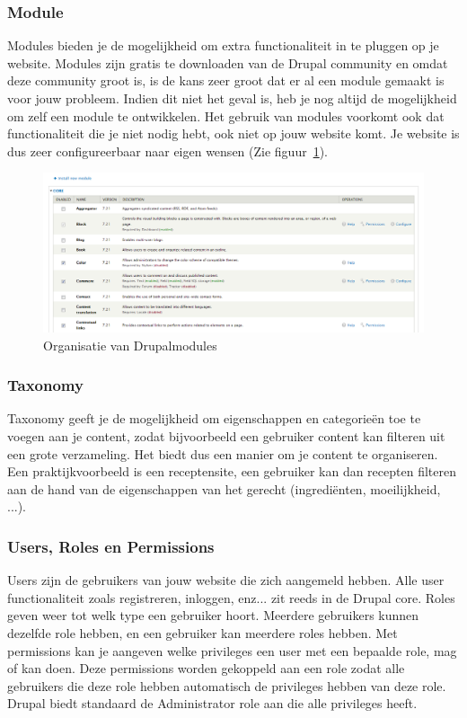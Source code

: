 \subsubsection{Module}
Modules bieden je de mogelijkheid om extra functionaliteit in te pluggen op je website. Modules zijn gratis te downloaden van de Drupal community en omdat deze community groot is, is de kans zeer groot dat er al een module gemaakt is voor jouw probleem. Indien dit niet het geval is, heb je nog altijd de mogelijkheid om zelf een module te ontwikkelen. Het gebruik van modules voorkomt ook dat functionaliteit die je niet nodig hebt, ook niet op jouw website komt. Je website is dus zeer configureerbaar naar eigen wensen (Zie figuur~\ref{fig:drupalOrganizeModules}).
\begin{figure}[h]
\includegraphics[width=1\textwidth]{fig/drupalOrganizeModules}
\caption{Organisatie van Drupalmodules}
\label{fig:drupalOrganizeModules}
\end{figure}

\subsubsection{Taxonomy}
Taxonomy geeft je de mogelijkheid om eigenschappen en categorie\"{e}n toe te voegen aan je content, zodat bijvoorbeeld een gebruiker content kan filteren uit een grote verzameling. Het biedt dus een manier om je content te organiseren. Een praktijkvoorbeeld is een receptensite, een gebruiker kan dan recepten filteren aan de hand van de eigenschappen van het gerecht (ingredi\"{e}nten, moeilijkheid, ...).

\subsubsection{Users, Roles en Permissions}
Users zijn de gebruikers van jouw website die zich aangemeld hebben. Alle user functionaliteit zoals registreren, inloggen, enz... zit reeds in de Drupal core. Roles geven weer tot welk type een gebruiker hoort. Meerdere gebruikers kunnen dezelfde role hebben, en een gebruiker kan meerdere roles hebben. Met permissions kan je aangeven welke privileges een user met een bepaalde role, mag of kan doen. Deze permissions worden gekoppeld aan een role zodat alle gebruikers die deze role hebben automatisch de privileges hebben van deze role. Drupal biedt standaard de Administrator role aan die alle privileges heeft.

